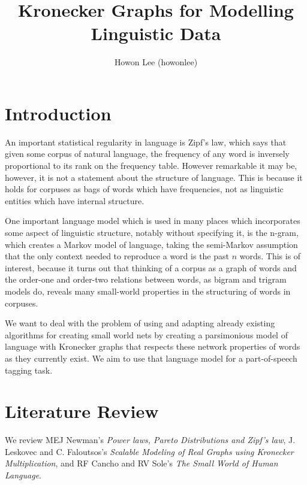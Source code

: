 \documentclass[12pt]{article}
\begin{document}
\title{Kronecker Graphs for Modelling Linguistic Data}
\author{Howon Lee (howonlee)}
\maketitle

\section{Introduction}


An important statistical regularity in language is Zipf's law, which says that given some corpus of natural language, the frequency of any word is inversely proportional to its rank on the frequency table. However remarkable it may be, however, it is not a statement about the structure of language. This is because it holds for corpuses as bags of words which have frequencies, not as linguistic entities which have internal structure. \cite{smallworldlang}

One important language model which is used in many places which incorporates some aspect of linguistic structure, notably without specifying it, is the n-gram, which creates a Markov model of language, taking the semi-Markov assumption that the only context needed to reproduce a word is the past $n$ words. This is of interest, because it turns out that thinking of a corpus as a graph of words and the order-one and order-two relations between words, as bigram and trigram models do, reveals many small-world properties in the structuring of words in corpuses.

We want to deal with the problem of using and adapting already existing algorithms for creating small world nets by creating a parsimonious model of language with Kronecker graphs that respects these network properties of words as they currently exist. We aim to use that language model for a part-of-speech tagging task.

\section{Literature Review}

We review MEJ Newman's \emph{Power laws, Pareto Distributions and Zipf's law}\cite{mejpowerlaw}, J. Leskovec and C. Faloutsos's \emph{Scalable Modeling of Real Graphs using Kronecker Multiplication}\cite{kronfit}, and RF Cancho and RV Sole's \emph{The Small World of Human Language}\cite{smallworldlang}.
\end{document}
